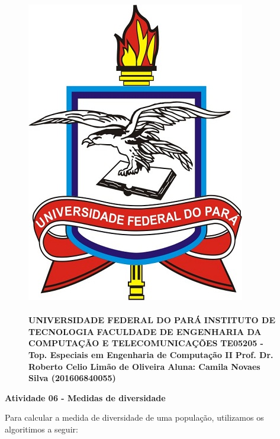 \documentclass[12pt]{article}
\title{}
\date{}
\begin{document}
\begin{figure}
		\begin{minipage}{.3\linewidth}
			\centering
			\includegraphics[width=.6\linewidth]{imgs/ufpa.jpg}
		\end{minipage}
		\begin{minipage}{.70\linewidth}
			\flushleft
			\paragraph{}
			\textbf{ }\newline
			\textbf{UNIVERSIDADE FEDERAL DO PARÁ} \newline
			\textbf{INSTITUTO DE TECNOLOGIA} \newline
			\textbf{FACULDADE DE ENGENHARIA DA COMPUTAÇÃO E TELECOMUNICAÇÕES} \newline
			\textbf{TE05205 - Top. Especiais em Engenharia de Computação II} \newline
            \textbf{Prof. Dr. Roberto Celio Limão de Oliveira} \newline
            \textbf{Aluna: Camila Novaes Silva (201606840055)}
		\end{minipage}
\end{figure}
\FloatBarrier
\begin{center}
    {\Large \textbf{Atividade 06 - Medidas de diversidade}}
\end{center}
\hfill

Para calcular a medida de diversidade de uma população, utilizamos os algoritimos a seguir:
\end{document}
